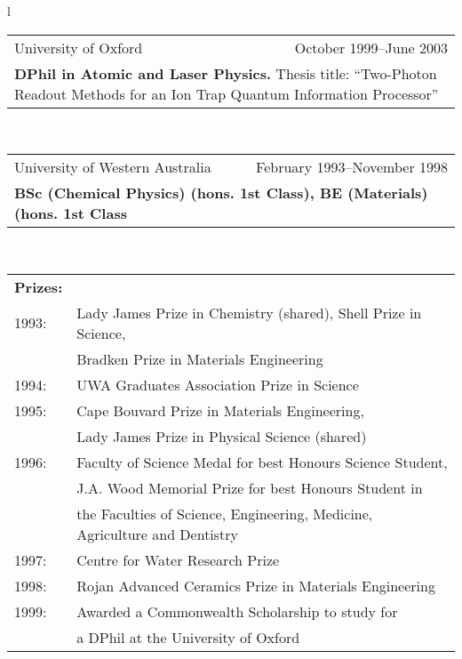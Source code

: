 \documentclass[10pt,a4paper]{article}
\makeatletter
\newcommand{\role}[5]{
\begin{tabular*}{150mm}{l@{\extracolsep{\fill}}r}
#5 & #1--#2 \\ 
\multicolumn{2}{p{140mm}}{\textbf{#3}{#4}} 
\end{tabular*}
\vspace{0.1in}
 }
\makeatother
\begin{document}
\begin{tabular}{l}
  \role{October 1999}{June 2003} 
     {DPhil in Atomic and Laser Physics.}{ Thesis title: 
     ``Two-Photon Readout Methods for an Ion Trap Quantum Information
     Processor''}
     {University of Oxford} \\
  \role{February 1993}{November 1998}
      {BSc (Chemical Physics) (hons. 1st Class), BE (Materials) (hons. 1st
      Class}{}
      {University of Western Australia}
    \\
    \begin{tabular*}{140mm}{ll}
      \textbf{Prizes:}\\
         1993: & Lady James Prize in Chemistry (shared), Shell Prize in
         Science, \\
         & Bradken Prize in Materials Engineering\\
         1994: & UWA Graduates Association Prize in Science\\
         1995: & Cape Bouvard Prize in Materials Engineering, \\
         & Lady James Prize in Physical Science (shared)\\
        1996: & Faculty of Science Medal for best Honours Science
        Student,\\
        & J.A. Wood Memorial Prize for best Honours Student in\\
        & the Faculties of Science, Engineering, Medicine, Agriculture
        and Dentistry\\
         1997: & Centre for Water Research Prize\\
         1998: & Rojan Advanced Ceramics Prize in Materials
         Engineering\\
         1999: & Awarded a Commonwealth Scholarship to study for\\
         & a DPhil at the University of Oxford
    \end{tabular*}

\end{tabular} \\
\end{document}

